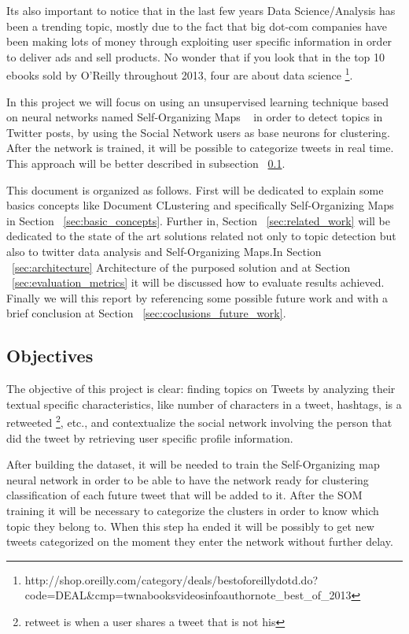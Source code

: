 Its also important to notice that in the last few years Data Science/Analysis has been a trending topic, mostly due to the fact that big dot-com companies have been making lots of money through exploiting user specific information in order to deliver ads and sell products. No wonder that if you look that in the top 10 ebooks sold by O'Reilly throughout 2013, four are about data science \footnote{http://shop.oreilly.com/category/deals/best\-of\-oreilly\-dotd.do?code=DEAL\&cmp=tw\-na\-books\-videos\-info\-authornote\_best\_of\_2013}.

In this project we will focus on using an unsupervised learning technique based on neural networks named Self-Organizing Maps ~\cite{Kohonen1990} in order to detect topics in Twitter posts, by using the Social Network users as base neurons for clustering. After the network is trained, it will be possible to categorize tweets in real time. This approach will be better described in subsection ~\ref{sub:objectives}.

This document is organized as follows. First will be dedicated to explain some basics concepts like Document CLustering and specifically Self-Organizing Maps in Section ~\ref{sec:basic_concepts}.  Further in, Section ~\ref{sec:related_work} will be dedicated to the state of the art solutions related not only to topic detection but also to twitter data analysis and Self-Organizing Maps.In Section ~\ref{sec:architecture} Architecture of the purposed solution and  at Section ~\ref{sec:evaluation_metrics} it will be discussed how to evaluate results achieved. Finally we will this report by referencing some possible future work and with a brief conclusion at Section ~\ref{sec:coclusions_future_work}.

\subsection{Objectives} %
\label{sub:objectives}

The objective of this project is clear: finding topics on Tweets by analyzing their textual specific characteristics, like number of characters in a tweet, hashtags, is a retweeted \footnote{retweet is when a user shares a tweet that is not his}, etc., and contextualize the social network involving the person that did the tweet by retrieving user specific profile information.

After building the dataset, it will be needed to train the Self-Organizing map neural network in order to be able to have the network ready for clustering classification of each future tweet that will be added to it. After the SOM training it will be necessary to categorize the clusters in order to know which topic they belong to. When this step ha ended it will be possibly to get new tweets categorized on the moment they enter the network without further delay.

